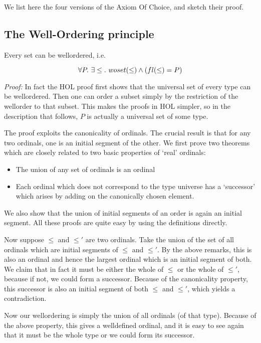 We list here the four versions of the Axiom Of Choice, and sketch their proof.

\subsection{The Well-Ordering principle}

Every set can be wellordered, i.e.

$$ \forall P.\ \exists \leq.\ woset(\leq) \wedge (fl(\leq) = P) $$

{\em Proof:} In fact the HOL proof first shows that the universal set of every
type can be wellordered. Then one can order a subset simply by the restriction
of the wellorder to that subset. This makes the proofs in HOL simpler, so in
the description that follows, $P$ is actually a universal set of some type.

The proof exploits the canonicality of ordinals. The crucial result is that for
any two ordinals, one is an initial segment of the other. We first prove two
theorems which are closely related to two basic properties of `real' ordinals:

\begin{itemize}

\item The union of any set of ordinals is an ordinal

\item Each ordinal which does not correspond to the type universe has a
`successor' which arises by adding on the canonically chosen element.

\end{itemize}

We also show that the union of initial segments of an order is again an initial
segment. All these proofs are quite easy by using the definitions directly.

Now suppose $\leq$ and $\leq'$ are two ordinals. Take the union of the set of
all ordinals which are initial segments of $\leq$ and $\leq'$. By the above
remarks, this is also an ordinal and hence the largest ordinal which is an
initial segment of both. We claim that in fact it must be either the whole of
$\leq$ or the whole of $\leq'$, because if not, we could form a successor.
Because of the canonicality property, this successor is also an initial segment
of both $\leq$ and $\leq'$, which yields a contradiction.

Now our wellordering is simply the union of all ordinals (of that type).
Because of the above property, this gives a welldefined ordinal, and it is easy
to see again that it must be the whole type or we could form its successor.

